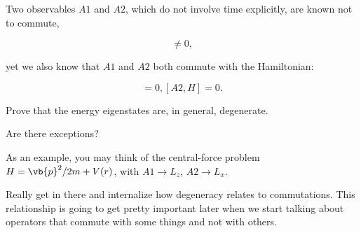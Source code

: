 \def\ctrois{C\'{o}mmute \`{a} Trois}

\begin{question}
  
Two observables $A1$ and $A2$, which do not involve time explicitly,
are known not to commute,

\begin{equation*}
  [A1 , A2] \ne 0,
\end{equation*}

yet we also know that $A1$ and $A2$ both commute with the Hamiltonian:

\begin{equation*}
  [A1, H] = 0, [A2, H] = 0.
\end{equation*}

\begin{questionpart}
  Prove that the energy eigenstates are, in general, degenerate.
\end{questionpart}

\begin{questionpart}
  Are there exceptions?
\end{questionpart}

\begin{questionpart}
  As an example, you may think of the central-force problem $H =
  \vb{p}^2/2m + V(r)$, with $A1 \rightarrow L_z$, $A2
  \rightarrow L_x$.
\end{questionpart}

\end{question}

\begin{purpose}
Really get in there and internalize how degeneracy relates to
commutations.  This relationship is going to get pretty important
later when we start talking about operators that commute with some
things and not with others.
\end{purpose}


